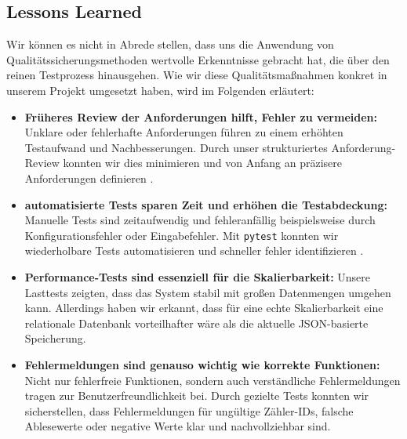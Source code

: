 \subsection{Lessons Learned}\label{subsec:lessons-learned}

Wir können es nicht in Abrede stellen, dass uns die Anwendung von Qualitätssicherungsmethoden wertvolle Erkenntnisse gebracht hat, die über den reinen Testprozess hinausgehen.
Wie wir diese Qualitätsmaßnahmen konkret in unserem Projekt umgesetzt haben, wird im Folgenden erläutert:

\begin{itemize}
    \item \textbf{Früheres Review der Anforderungen hilft, Fehler zu vermeiden:} Unklare oder fehlerhafte Anforderungen führen zu einem erhöhten Testaufwand und Nachbesserungen.
    Durch unser strukturiertes Anforderung-Review konnten wir dies minimieren und von Anfang an präzisere Anforderungen definieren \cite{DaiglGlunz2024}.
    \item \textbf{automatisierte Tests sparen Zeit und erhöhen die Testabdeckung:} Manuelle Tests sind zeitaufwendig und fehleranfällig beispielsweise durch Konfigurationsfehler oder Eingabefehler.
    Mit \texttt{pytest} konnten wir wiederholbare Tests automatisieren und schneller fehler identifizieren \cite{Röttgeretal2024}.
    \item \textbf{Performance-Tests sind essenziell für die Skalierbarkeit:} Unsere Lasttests zeigten, dass das System stabil mit großen Datenmengen umgehen kann.
    Allerdings haben wir erkannt, dass für eine echte Skalierbarkeit eine relationale Datenbank vorteilhafter wäre als die aktuelle JSON-basierte Speicherung.
    \item \textbf{Fehlermeldungen sind genauso wichtig wie korrekte Funktionen:} Nicht nur fehlerfreie Funktionen, sondern auch verständliche Fehlermeldungen tragen zur Benutzerfreundlichkeit bei.
    Durch gezielte Tests konnten wir sicherstellen, dass Fehlermeldungen für ungültige Zähler-IDs, falsche Ablesewerte oder negative Werte klar und nachvollziehbar sind.
\end{itemize}
